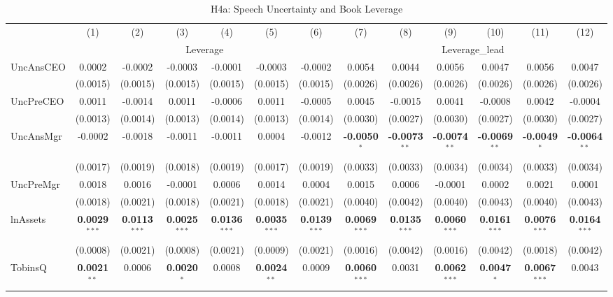 \documentclass[11pt,a4paper]{article}
\begin{document}
\begin{table}[htbp]
\centering
\caption{H4a: Speech Uncertainty and Book Leverage}
\label{tab:h4a}
\scriptsize
\begin{tabular}{lcccccccccccc}
\toprule
 & (1) & (2) & (3) & (4) & (5) & (6) & (7) & (8) & (9) & (10) & (11) & (12) \\
 & \multicolumn{6}{c}{Leverage} & \multicolumn{6}{c}{Leverage\_lead} \\
\cmidrule(lr){2-7} \cmidrule(lr){8-13}
\midrule
UncAnsCEO & 0.0002 & -0.0002 & -0.0003 & -0.0001 & -0.0003 & -0.0002 & 0.0054 & 0.0044 & 0.0056 & 0.0047 & 0.0056 & 0.0047 \\
 & (0.0015) & (0.0015) & (0.0015) & (0.0015) & (0.0015) & (0.0015) & (0.0026) & (0.0026) & (0.0026) & (0.0026) & (0.0026) & (0.0026) \\
UncPreCEO & 0.0011 & -0.0014 & 0.0011 & -0.0006 & 0.0011 & -0.0005 & 0.0045 & -0.0015 & 0.0041 & -0.0008 & 0.0042 & -0.0004 \\
 & (0.0013) & (0.0014) & (0.0013) & (0.0014) & (0.0013) & (0.0014) & (0.0030) & (0.0027) & (0.0030) & (0.0027) & (0.0030) & (0.0027) \\
UncAnsMgr & -0.0002 & -0.0018 & -0.0011 & -0.0011 & 0.0004 & -0.0012 & \textbf{-0.0050}$^{*}$ & \textbf{-0.0073}$^{**}$ & \textbf{-0.0074}$^{**}$ & \textbf{-0.0069}$^{**}$ & \textbf{-0.0049}$^{*}$ & \textbf{-0.0064}$^{**}$ \\
 & (0.0017) & (0.0019) & (0.0018) & (0.0019) & (0.0017) & (0.0019) & (0.0033) & (0.0033) & (0.0034) & (0.0034) & (0.0033) & (0.0034) \\
UncPreMgr & 0.0018 & 0.0016 & -0.0001 & 0.0006 & 0.0014 & 0.0004 & 0.0015 & 0.0006 & -0.0001 & 0.0002 & 0.0021 & 0.0001 \\
 & (0.0018) & (0.0021) & (0.0018) & (0.0021) & (0.0018) & (0.0021) & (0.0040) & (0.0042) & (0.0040) & (0.0043) & (0.0040) & (0.0043) \\
\midrule
lnAssets & \textbf{0.0029}$^{***}$ & \textbf{0.0113}$^{***}$ & \textbf{0.0025}$^{***}$ & \textbf{0.0136}$^{***}$ & \textbf{0.0035}$^{***}$ & \textbf{0.0139}$^{***}$ & \textbf{0.0069}$^{***}$ & \textbf{0.0135}$^{***}$ & \textbf{0.0060}$^{***}$ & \textbf{0.0161}$^{***}$ & \textbf{0.0076}$^{***}$ & \textbf{0.0164}$^{***}$ \\
 & (0.0008) & (0.0021) & (0.0008) & (0.0021) & (0.0009) & (0.0021) & (0.0016) & (0.0042) & (0.0016) & (0.0042) & (0.0018) & (0.0042) \\
TobinsQ & \textbf{0.0021}$^{**}$ & 0.0006 & \textbf{0.0020}$^{*}$ & 0.0008 & \textbf{0.0024}$^{**}$ & 0.0009 & \textbf{0.0060}$^{***}$ & 0.0031 & \textbf{0.0062}$^{***}$ & \textbf{0.0047}$^{*}$ & \textbf{0.0067}$^{***}$ & 0.0043 \\

\end{tabular}
\end{table}
\end{document}
